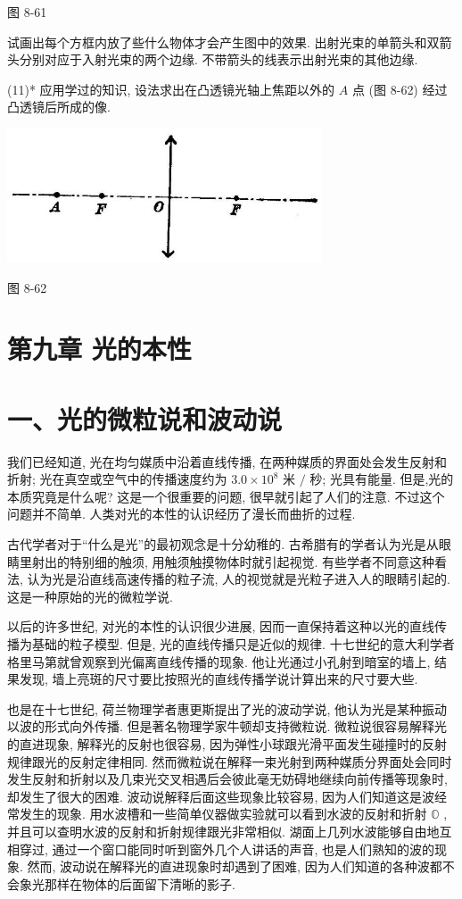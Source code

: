 \documentclass[10pt]{article}
\begin{document}
图 8-61

试画出每个方框内放了些什么物体才会产生图中的效果. 出射光束的单箭头和双箭头分别对应于入射光束的两个边缘. 不带箭头的线表示出射光束的其他边缘.

(11)* 应用学过的知识, 设法求出在凸透镜光轴上焦距以外的 \(A\) 点 (图 8-62) 经过凸透镜后所成的像.

\begin{center}
\includegraphics[max width=0.7\textwidth]{images/01913056-1f15-74d8-9184-9aab52c9d66b_296_925610.jpg}
\end{center}

图 8-62

\section*{第九章 光的本性}

\section*{一、光的微粒说和波动说}

我们已经知道, 光在均匀媒质中沿着直线传播, 在两种媒质的界面处会发生反射和折射; 光在真空或空气中的传播速度约为 \({3.0} \times {10}^{8}\) 米 \(/\) 秒; 光具有能量. 但是,光的本质究竟是什么呢? 这是一个很重要的问题, 很早就引起了人们的注意. 不过这个问题并不简单. 人类对光的本性的认识经历了漫长而曲折的过程.

古代学者对于“什么是光”的最初观念是十分幼稚的. 古希腊有的学者认为光是从眼睛里射出的特别细的触须, 用触须触摸物体时就引起视觉. 有些学者不同意这种看法, 认为光是沿直线高速传播的粒子流, 人的视觉就是光粒子进入人的眼睛引起的. 这是一种原始的光的微粒学说.

以后的许多世纪, 对光的本性的认识很少进展, 因而一直保持着这种以光的直线传播为基础的粒子模型. 但是, 光的直线传播只是近似的规律. 十七世纪的意大利学者格里马第就曾观察到光偏离直线传播的现象. 他让光通过小孔射到暗室的墙上, 结果发现, 墙上亮斑的尺寸要比按照光的直线传播学说计算出来的尺寸要大些.

也是在十七世纪, 荷兰物理学者惠更斯提出了光的波动学说, 他认为光是某种振动以波的形式向外传播. 但是著名物理学家牛顿却支持微粒说. 微粒说很容易解释光的直进现象, 解释光的反射也很容易, 因为弹性小球跟光滑平面发生碰撞时的反射规律跟光的反射定律相同. 然而微粒说在解释一束光射到两种媒质分界面处会同时发生反射和折射以及几束光交叉相遇后会彼此毫无妨碍地继续向前传播等现象时, 却发生了很大的困难. 波动说解释后面这些现象比较容易, 因为人们知道这是波经常发生的现象. 用水波槽和一些简单仪器做实验就可以看到水波的反射和折射 \(\mathbb{O}\) ,并且可以查明水波的反射和折射规律跟光非常相似. 湖面上几列水波能够自由地互相穿过, 通过一个窗口能同时听到窗外几个人讲话的声音, 也是人们熟知的波的现象. 然而, 波动说在解释光的直进现象时却遇到了困难, 因为人们知道的各种波都不会象光那样在物体的后面留下清晰的影子.
\end{document}
